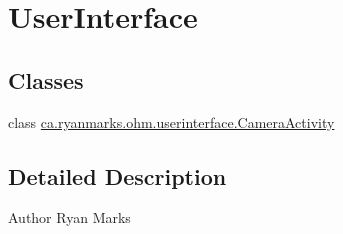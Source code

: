 \hypertarget{group___user_interface}{}\section{User\+Interface}
\label{group___user_interface}
\subsection*{Classes}
\begin{DoxyCompactItemize}
\item 
class \hyperlink{classca_1_1ryanmarks_1_1ohm_1_1userinterface_1_1_camera_activity}{ca.\+ryanmarks.\+ohm.\+userinterface.\+Camera\+Activity}
\end{DoxyCompactItemize}


\subsection{Detailed Description}
\begin{DoxyAuthor}{Author}
Ryan Marks 
\end{DoxyAuthor}
